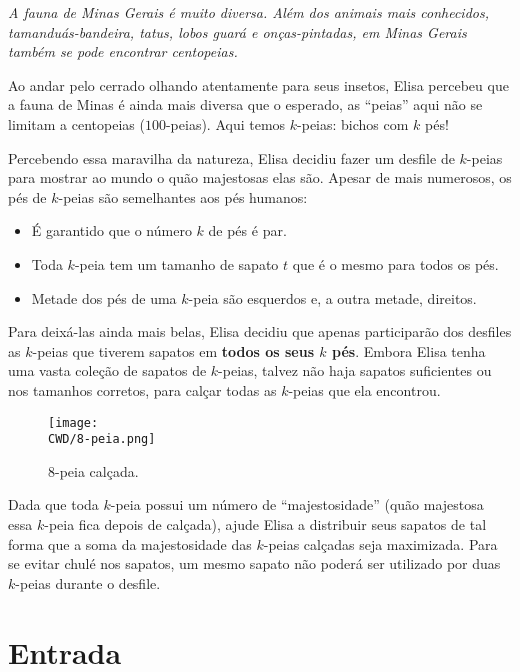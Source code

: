 %

\begin{center}
\textit{
  A fauna de Minas Gerais é muito diversa. Além dos animais mais conhecidos, tamanduás-bandeira, tatus, lobos guará e onças-pintadas, em Minas Gerais também se pode encontrar centopeias. 
  }
\end{center}
  
  Ao andar pelo cerrado olhando atentamente para seus insetos, Elisa percebeu que a fauna de Minas é ainda mais diversa que o esperado, as ``peias'' aqui não se limitam a centopeias ($100$-peias). Aqui temos $k$-peias: bichos com $k$ pés!
    
  Percebendo essa maravilha da natureza, Elisa decidiu fazer um desfile de $k$-peias para mostrar ao mundo o quão majestosas elas são.   Apesar de mais numerosos, os pés de $k$-peias são semelhantes aos pés humanos:
\begin{itemize}
  \item É garantido que o número $k$ de pés é par.
  \item Toda $k$-peia tem um tamanho de sapato $t$ que é o mesmo para todos os pés.
  \item Metade dos pés de uma $k$-peia são esquerdos e, a outra metade, direitos.
\end{itemize}


Para deixá-las ainda mais belas, Elisa decidiu que apenas participarão dos desfiles as $k$-peias que tiverem sapatos em \textbf{todos os seus $k$ pés}. Embora Elisa tenha uma vasta coleção de sapatos de $k$-peias, talvez não haja sapatos suficientes ou nos tamanhos corretos, para calçar todas as $k$-peias que ela encontrou.
  
  \begin{figure}[H]
    \centering
    \texttt{[image: \\CWD/8-peia.png]}
    \caption{8-peia calçada.}
  \end{figure}



Dada que toda $k$-peia possui um número de ``majestosidade'' (quão majestosa essa $k$-peia fica depois de calçada), ajude Elisa a distribuir seus sapatos de tal forma que a soma da majestosidade das $k$-peias calçadas seja maximizada. Para se evitar chulé nos sapatos, um mesmo sapato não poderá ser utilizado por duas $k$-peias durante o desfile.

%
\section*{Entrada}

